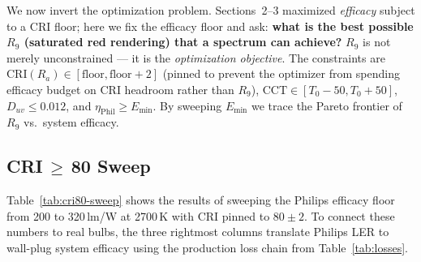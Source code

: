 \documentclass[11pt]{article}
\begin{document}
We now invert the optimization problem.  Sections~2--3 maximized
\emph{efficacy} subject to a CRI floor; here we fix the efficacy floor and
ask: \textbf{what is the best possible $R_9$ (saturated red rendering) that
a spectrum can achieve?}  $R_9$ is not merely unconstrained --- it is the
\emph{optimization objective}.  The constraints are
$\text{CRI}(R_a) \in [\text{floor}, \text{floor}+2]$ (pinned to prevent
the optimizer from spending efficacy budget on CRI headroom rather than
$R_9$), $\text{CCT} \in [T_0-50, T_0+50]$, $D_{uv} \leq 0.012$, and
$\eta_{\text{Phil}} \geq E_{\min}$.  By sweeping $E_{\min}$ we trace the
Pareto frontier of $R_9$ vs.\ system efficacy.

\subsection{CRI\,$\geq$\,80 Sweep}

Table~\ref{tab:cri80-sweep} shows the results of sweeping the Philips
efficacy floor from 200 to 320\,lm/W at 2700\,K with CRI pinned
to $80 \pm 2$.  To connect these numbers to real bulbs, the three
rightmost columns translate Philips LER to wall-plug system efficacy
using the production loss chain from Table~\ref{tab:losses}.
\end{document}
